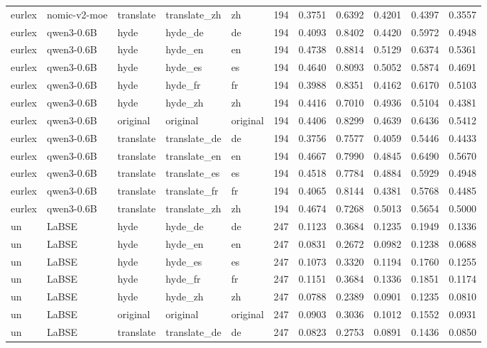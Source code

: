\begin{tabular}{lllllrrrrrr}
eurlex & nomic-v2-moe & translate & translate\_zh & zh & 194 & 0.3751 & 0.6392 & 0.4201 & 0.4397 & 0.3557 \\
eurlex & qwen3-0.6B & hyde & hyde\_de & de & 194 & 0.4093 & 0.8402 & 0.4420 & 0.5972 & 0.4948 \\
eurlex & qwen3-0.6B & hyde & hyde\_en & en & 194 & 0.4738 & 0.8814 & 0.5129 & 0.6374 & 0.5361 \\
eurlex & qwen3-0.6B & hyde & hyde\_es & es & 194 & 0.4640 & 0.8093 & 0.5052 & 0.5874 & 0.4691 \\
eurlex & qwen3-0.6B & hyde & hyde\_fr & fr & 194 & 0.3988 & 0.8351 & 0.4162 & 0.6170 & 0.5103 \\
eurlex & qwen3-0.6B & hyde & hyde\_zh & zh & 194 & 0.4416 & 0.7010 & 0.4936 & 0.5104 & 0.4381 \\
eurlex & qwen3-0.6B & original & original & original & 194 & 0.4406 & 0.8299 & 0.4639 & 0.6436 & 0.5412 \\
eurlex & qwen3-0.6B & translate & translate\_de & de & 194 & 0.3756 & 0.7577 & 0.4059 & 0.5446 & 0.4433 \\
eurlex & qwen3-0.6B & translate & translate\_en & en & 194 & 0.4667 & 0.7990 & 0.4845 & 0.6490 & 0.5670 \\
eurlex & qwen3-0.6B & translate & translate\_es & es & 194 & 0.4518 & 0.7784 & 0.4884 & 0.5929 & 0.4948 \\
eurlex & qwen3-0.6B & translate & translate\_fr & fr & 194 & 0.4065 & 0.8144 & 0.4381 & 0.5768 & 0.4485 \\
eurlex & qwen3-0.6B & translate & translate\_zh & zh & 194 & 0.4674 & 0.7268 & 0.5013 & 0.5654 & 0.5000 \\
un & LaBSE & hyde & hyde\_de & de & 247 & 0.1123 & 0.3684 & 0.1235 & 0.1949 & 0.1336 \\
un & LaBSE & hyde & hyde\_en & en & 247 & 0.0831 & 0.2672 & 0.0982 & 0.1238 & 0.0688 \\
un & LaBSE & hyde & hyde\_es & es & 247 & 0.1073 & 0.3320 & 0.1194 & 0.1760 & 0.1255 \\
un & LaBSE & hyde & hyde\_fr & fr & 247 & 0.1151 & 0.3684 & 0.1336 & 0.1851 & 0.1174 \\
un & LaBSE & hyde & hyde\_zh & zh & 247 & 0.0788 & 0.2389 & 0.0901 & 0.1235 & 0.0810 \\
un & LaBSE & original & original & original & 247 & 0.0903 & 0.3036 & 0.1012 & 0.1552 & 0.0931 \\
un & LaBSE & translate & translate\_de & de & 247 & 0.0823 & 0.2753 & 0.0891 & 0.1436 & 0.0850 \\

\end{tabular}
